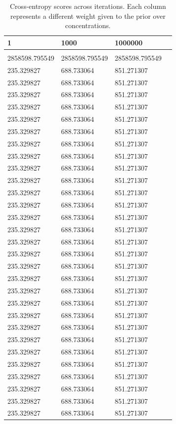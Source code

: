 \begin{table}\begin{tabular}{|l|l|l|l|}
\hline
1&1000&1000000\\
\hline\\
2858598.795549&2858598.795549&2858598.795549\\
235.329827&688.733064&851.271307\\
235.329827&688.733064&851.271307\\
235.329827&688.733064&851.271307\\
235.329827&688.733064&851.271307\\
235.329827&688.733064&851.271307\\
235.329827&688.733064&851.271307\\
235.329827&688.733064&851.271307\\
235.329827&688.733064&851.271307\\
235.329827&688.733064&851.271307\\
235.329827&688.733064&851.271307\\
235.329827&688.733064&851.271307\\
235.329827&688.733064&851.271307\\
235.329827&688.733064&851.271307\\
235.329827&688.733064&851.271307\\
235.329827&688.733064&851.271307\\
235.329827&688.733064&851.271307\\
235.329827&688.733064&851.271307\\
235.329827&688.733064&851.271307\\
235.329827&688.733064&851.271307\\
235.329827&688.733064&851.271307\\
235.329827&688.733064&851.271307\\
235.329827&688.733064&851.271307\\
235.329827&688.733064&851.271307\\
235.329827&688.733064&851.271307\\
235.329827&688.733064&851.271307\\
235.329827&688.733064&851.271307\\
235.329827&688.733064&851.271307\\
235.329827&688.733064&851.271307\\
235.329827&688.733064&851.271307\\
\hline
\end{tabular}\caption{
Cross-entropy scores across iterations. Each column represents a different weight given to the prior over concentrations.}\end{table}


